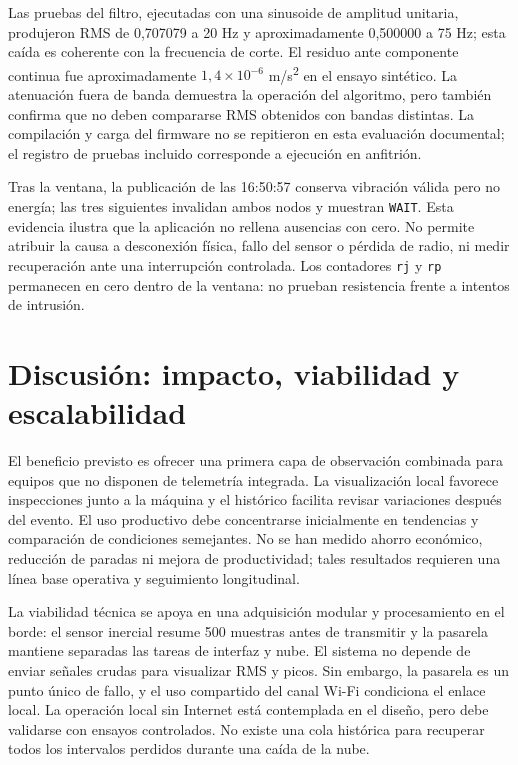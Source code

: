 \documentclass[journal,onecolumn,11pt,a4paper]{IEEEtran}
\begin{document}
Las pruebas del filtro, ejecutadas con una sinusoide de amplitud unitaria, produjeron RMS de 0,707079 a 20 Hz y aproximadamente 0,500000 a 75 Hz; esta caída es coherente con la frecuencia de corte. El residuo ante componente continua fue aproximadamente $1,4\times10^{-6}$ m/s\textsuperscript{2} en el ensayo sintético. La atenuación fuera de banda demuestra la operación del algoritmo, pero también confirma que no deben compararse RMS obtenidos con bandas distintas. La compilación y carga del firmware no se repitieron en esta evaluación documental; el registro de pruebas incluido corresponde a ejecución en anfitrión.

Tras la ventana, la publicación de las 16:50:57 conserva vibración válida pero no energía; las tres siguientes invalidan ambos nodos y muestran \texttt{WAIT}. Esta evidencia ilustra que la aplicación no rellena ausencias con cero. No permite atribuir la causa a desconexión física, fallo del sensor o pérdida de radio, ni medir recuperación ante una interrupción controlada. Los contadores \texttt{rj} y \texttt{rp} permanecen en cero dentro de la ventana: no prueban resistencia frente a intentos de intrusión.

\FloatBarrier
\section{Discusión: impacto, viabilidad y escalabilidad}
El beneficio previsto es ofrecer una primera capa de observación combinada para equipos que no disponen de telemetría integrada. La visualización local favorece inspecciones junto a la máquina y el histórico facilita revisar variaciones después del evento. El uso productivo debe concentrarse inicialmente en tendencias y comparación de condiciones semejantes. No se han medido ahorro económico, reducción de paradas ni mejora de productividad; tales resultados requieren una línea base operativa y seguimiento longitudinal.

La viabilidad técnica se apoya en una adquisición modular y procesamiento en el borde: el sensor inercial resume 500 muestras antes de transmitir y la pasarela mantiene separadas las tareas de interfaz y nube. El sistema no depende de enviar señales crudas para visualizar RMS y picos. Sin embargo, la pasarela es un punto único de fallo, y el uso compartido del canal Wi-Fi condiciona el enlace local. La operación local sin Internet está contemplada en el diseño, pero debe validarse con ensayos controlados. No existe una cola histórica para recuperar todos los intervalos perdidos durante una caída de la nube.
\end{document}
